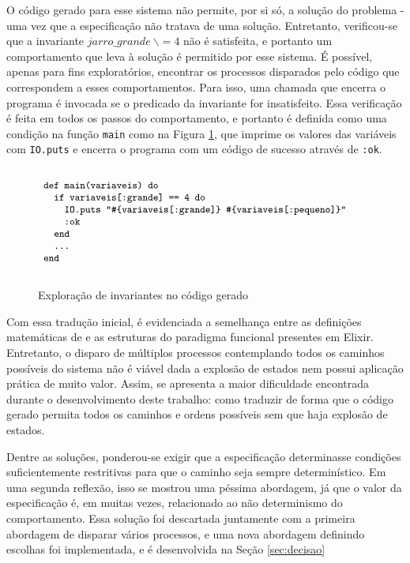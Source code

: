 O código gerado para esse sistema não permite, por si só, a solução do problema - uma vez que a especificação não tratava de uma solução. Entretanto, verificou-se que a invariante $jarro\_grande\ \backslash= 4$ não é satisfeita, e portanto um comportamento que leva à solução é permitido por esse sistema. É possível, apenas para fins exploratórios, encontrar os processos disparados pelo código que correspondem a esses comportamentos. Para isso, uma chamada que encerra o programa é invocada se o predicado da invariante for insatisfeito. Essa verificação é feita em todos os passos do comportamento, e portanto é definida como uma condição na função \texttt{main} como na Figura \ref{fig:invariant-ex1}, que imprime os valores das variáveis com \texttt{IO.puts} e encerra o programa com um código de sucesso através de \texttt{:ok}.

\begin{figure}[h]
  \centering
  $\progfig{
  ~def main(variaveis) do\\
  ~~~if variaveis[:grande] == 4 do\\
  ~~~~~IO.puts "\#\{variaveis[:grande]\} \#\{variaveis[:pequeno]\}"\\
  ~~~~~:ok\\
  ~~~end\\
  ~~~\dots\\
  ~end
  }$
  \caption{Exploração de invariantes no código gerado}
\label{fig:invariant-ex1}
\end{figure}

Com essa tradução inicial, é evidenciada a semelhança entre as definições
matemáticas de \TLA e as estruturas do paradigma funcional presentes em Elixir.
Entretanto, o disparo de múltiplos processos contemplando todos os caminhos
possíveis do sistema não é viável dada a explosão de estados nem possui
aplicação prática de muito valor. Assim, se apresenta a maior dificuldade
encontrada durante o desenvolvimento deste trabalho: como traduzir de forma que
o código gerado permita todos os caminhos e ordens possíveis sem que haja
explosão de estados.

Dentre as soluções, ponderou-se exigir que a especificação determinasse
condições suficientemente restritivas para que o caminho seja sempre
determinístico. Em uma segunda reflexão, isso se mostrou uma péssima abordagem,
já que o valor da especificação é, em muitas vezes, relacionado ao não
determinismo do comportamento. Essa solução foi descartada juntamente com a
primeira abordagem de disparar vários processos, e uma nova abordagem definindo
escolhas foi implementada, e é desenvolvida na Seção \ref{sec:decisao} 

